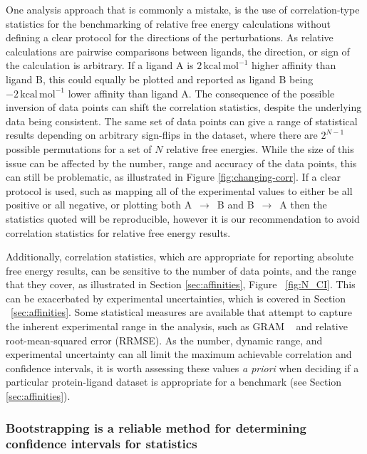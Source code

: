\documentclass[9pt,bestpractices,pubversion]{livecoms}
\begin{document}
One analysis approach that is commonly a mistake, is the use of correlation-type statistics for the benchmarking of relative free energy calculations without defining a clear protocol for the directions of the perturbations. As relative calculations are pairwise comparisons between ligands, the direction, or sign of the calculation is arbitrary. If a ligand A is $2\,\mathrm{kcal\,mol^{-1}}$ higher affinity than ligand B, this could equally be plotted and reported as ligand B being $-2\,\mathrm{kcal\,mol^{-1}}$ lower affinity than ligand A. The consequence of the possible inversion of data points can shift the correlation statistics, despite the underlying data being consistent. The same set of data points can give a range of statistical results depending on arbitrary sign-flips in the dataset, where there are $2^{N-1}$ possible permutations for a set of $N$ relative free energies. While the size of this issue can be affected by the number, range and accuracy of the data points, this can still be problematic, as illustrated in Figure \ref{fig:changing-corr}. If a clear protocol is used, such as mapping all of the experimental values to either be all positive or all negative, or plotting both A~$\rightarrow$~B and B~$\rightarrow$~A then the statistics quoted will be reproducible, however it is our recommendation to avoid correlation statistics for relative free energy results.

Additionally, correlation statistics, which are appropriate for reporting absolute free energy results, can be sensitive to the number of data points, and the range that they cover, as illustrated in Section \ref{sec:affinities}, Figure ~\ref{fig:N_CI}. This can be exacerbated by experimental uncertainties, which is covered in Section ~\ref{sec:affinities}. Some statistical measures are available that attempt to capture the inherent experimental range in the analysis, such as GRAM ~\cite{cui2019gram} and relative root-mean-squared error (RRMSE). As the number, dynamic range, and experimental uncertainty can all limit the maximum achievable correlation and confidence intervals, it is worth assessing these values \textit{a priori} when deciding if a particular protein-ligand dataset is appropriate for a benchmark (see Section \ref{sec:affinities}).


\subsubsection{Bootstrapping is a reliable method for determining confidence intervals for statistics}
\end{document}
